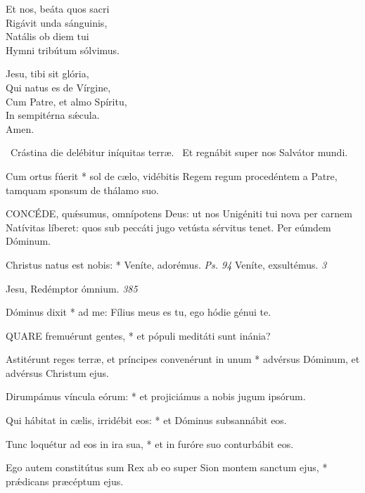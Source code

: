 Et nos, beáta quos sacri\\
Rigávit unda sánguinis,\\
Natális ob diem tui\\
Hymni tribútum sólvimus.

Jesu, tibi sit glória,\\
Qui natus es de Vírgine,\\
Cum Patre, et almo Spíritu,\\
In sempitérna sǽcula.\\
Amen.


\V\ Crástina die delébitur iníquitas terræ. \R\ Et regnábit super nos Salvátor mundi.

 Cum ortus fúerit * sol de cælo, vidébitis Regem regum procedéntem a Patre, tamquam sponsum de thálamo suo.


\lettrine[lines=2]{C}{ONCÉDE}, quǽsumus, omnípotens Deus: ut nos Unigéniti tui nova per carnem Natívitas líberet: quos sub peccáti jugo vetústa sérvitus tenet. Per eúmdem Dóminum.



 Christus natus est nobis: * Veníte, adorémus. \textit{Ps. 94} Veníte, exsultémus. \textit{3}

 Jesu, Redémptor ómnium. \textit{385}


 Dóminus dixit * ad me: Fílius meus es tu, ego hódie génui te.


\lettrine[lines=2]{Q}{UARE} fremuérunt gentes, * et pópuli meditáti sunt inánia?

Astitérunt reges terræ, et príncipes convenérunt in unum * advérsus Dóminum, et advérsus Christum ejus.

Dirumpámus víncula eórum: * et projiciámus a nobis jugum ipsórum.

Qui hábitat in cælis, irridébit eos: * et Dóminus subsannábit eos.

Tunc loquétur ad eos in ira sua, * et in furóre suo conturbábit eos.

Ego autem constitútus sum Rex ab eo super Sion montem sanctum ejus, * prǽdicans præcéptum ejus.

